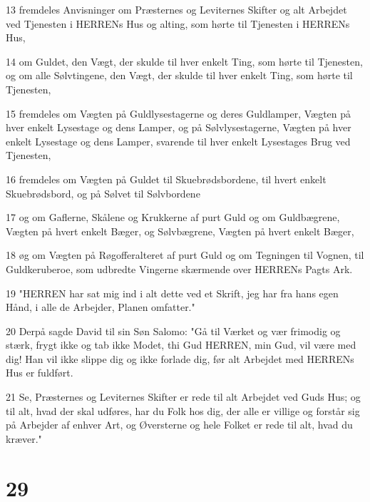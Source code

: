 \par 13 fremdeles Anvisninger om Præsternes og Leviternes Skifter og alt Arbejdet ved Tjenesten i HERRENs Hus og alting, som hørte til Tjenesten i HERRENs Hus,
\par 14 om Guldet, den Vægt, der skulde til hver enkelt Ting, som hørte til Tjenesten, og om alle Sølvtingene, den Vægt, der skulde til hver enkelt Ting, som hørte til Tjenesten,
\par 15 fremdeles om Vægten på Guldlysestagerne og deres Guldlamper, Vægten på hver enkelt Lysestage og dens Lamper, og på Sølvlysestagerne, Vægten på hver enkelt Lysestage og dens Lamper, svarende til hver enkelt Lysestages Brug ved Tjenesten,
\par 16 fremdeles om Vægten på Guldet til Skuebrødsbordene, til hvert enkelt Skuebrødsbord, og på Sølvet til Sølvbordene
\par 17 og om Gaflerne, Skålene og Krukkerne af purt Guld og om Guldbægrene, Vægten på hvert enkelt Bæger, og Sølvbægrene, Vægten på hvert enkelt Bæger,
\par 18 øg om Vægten på Røgofferalteret af purt Guld og om Tegningen til Vognen, til Guldkeruberoe, som udbredte Vingerne skærmende over HERRENs Pagts Ark.
\par 19 "HERREN har sat mig ind i alt dette ved et Skrift, jeg har fra hans egen Hånd, i alle de Arbejder, Planen omfatter."
\par 20 Derpå sagde David til sin Søn Salomo: "Gå til Værket og vær frimodig og stærk, frygt ikke og tab ikke Modet, thi Gud HERREN, min Gud, vil være med dig! Han vil ikke slippe dig og ikke forlade dig, før alt Arbejdet med HERRENs Hus er fuldført.
\par 21 Se, Præsternes og Leviternes Skifter er rede til alt Arbejdet ved Guds Hus; og til alt, hvad der skal udføres, har du Folk hos dig, der alle er villige og forstår sig på Arbejder af enhver Art, og Øversterne og hele Folket er rede til alt, hvad du kræver."

\chapter{29}

